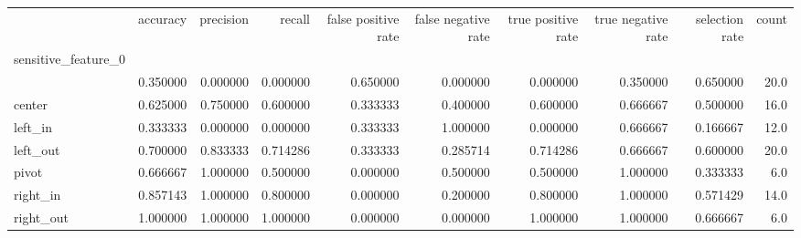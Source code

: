 \begin{tabular}{lrrrrrrrrr}
\toprule
{} &  accuracy &  precision &    recall &  false positive rate &  false negative rate &  true positive rate &  true negative rate &  selection rate &  count \\
sensitive\_feature\_0 &           &            &           &                      &                      &                     &                     &                 &        \\
\midrule
                    &  0.350000 &   0.000000 &  0.000000 &             0.650000 &             0.000000 &            0.000000 &            0.350000 &        0.650000 &   20.0 \\
center              &  0.625000 &   0.750000 &  0.600000 &             0.333333 &             0.400000 &            0.600000 &            0.666667 &        0.500000 &   16.0 \\
left\_in             &  0.333333 &   0.000000 &  0.000000 &             0.333333 &             1.000000 &            0.000000 &            0.666667 &        0.166667 &   12.0 \\
left\_out            &  0.700000 &   0.833333 &  0.714286 &             0.333333 &             0.285714 &            0.714286 &            0.666667 &        0.600000 &   20.0 \\
pivot               &  0.666667 &   1.000000 &  0.500000 &             0.000000 &             0.500000 &            0.500000 &            1.000000 &        0.333333 &    6.0 \\
right\_in            &  0.857143 &   1.000000 &  0.800000 &             0.000000 &             0.200000 &            0.800000 &            1.000000 &        0.571429 &   14.0 \\
right\_out           &  1.000000 &   1.000000 &  1.000000 &             0.000000 &             0.000000 &            1.000000 &            1.000000 &        0.666667 &    6.0 \\
\bottomrule
\end{tabular}
